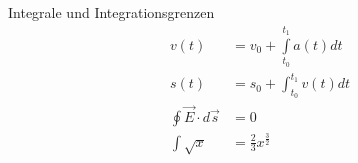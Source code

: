 \documentclass[12pt,a5paper]{book}
\begin{document}
Integrale und Integrationsgrenzen
\begin{align}
v(t) &= v_0 +  \int\limits_{t_0}^{t_1}  a(t) dt \\
s(t) &= s_0 +  \int_{t_0}^{t_1}  v(t) dt \\
\oint \vec{E} \cdot d\vec{s} &= 0\\
\int \sqrt{x} &= \frac{2}{3} x^{\frac{3}{2}}
\end{align}
\end{document}
